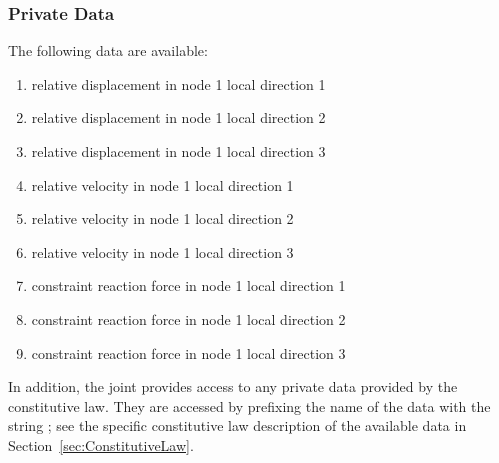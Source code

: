 \subsubsection{Private Data}
The following data are available:
\begin{enumerate}
\item {} relative displacement in node 1 local direction 1
\item {} relative displacement in node 1 local direction 2
\item {} relative displacement in node 1 local direction 3
\item {} relative velocity in node 1 local direction 1
\item {} relative velocity in node 1 local direction 2
\item {} relative velocity in node 1 local direction 3
\item {} constraint reaction force in node 1 local direction 1
\item {} constraint reaction force in node 1 local direction 2
\item {} constraint reaction force in node 1 local direction 3
\end{enumerate}
In addition, the joint provides
access to any private data provided by the constitutive law.
They are accessed by prefixing the name of the data with the string
; see the specific constitutive law
description of the available data in Section~\ref{sec:ConstitutiveLaw}.

